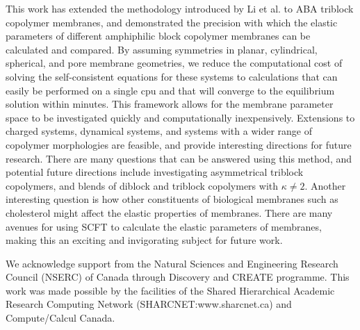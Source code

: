 \documentclass[twocolumn,aps,floatfix,nobibnotes]{revtex4-1}
\begin{document}
\indent This work has extended the methodology introduced by Li et al. to ABA triblock copolymer membranes, and demonstrated the precision with which the elastic parameters of different amphiphilic block copolymer membranes can be calculated and compared. By assuming symmetries in planar, cylindrical, spherical, and pore membrane geometries, we reduce the computational cost of solving the self-consistent equations for these systems to calculations that can easily be performed on a single cpu and that will converge to the equilibrium solution within minutes. This framework allows for the membrane parameter space to be investigated quickly and computationally inexpensively. Extensions to charged systems, dynamical systems, and systems with a wider range of copolymer morphologies are feasible, and provide interesting directions for future research. There are many questions that can be answered using this method, and potential future directions include investigating asymmetrical triblock copolymers, and blends of diblock and triblock copolymers with $\kappa \neq 2$. Another interesting question is how other constituents of biological membranes such as cholesterol might affect the elastic properties of membranes. There are many avenues for using SCFT to calculate the elastic parameters of membranes, making this an exciting and invigorating subject for future work.






 \begin{acknowledgments}
We acknowledge support from the Natural Sciences and Engineering Research Council (NSERC) of Canada through Discovery and CREATE programme.
This work was made possible by the facilities of the Shared Hierarchical Academic Research Computing Network (SHARCNET:www.sharcnet.ca) and Compute/Calcul Canada.
 \end{acknowledgments}




%
%





\end{document}
